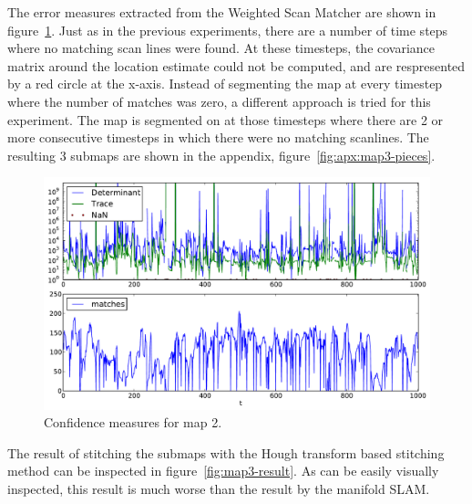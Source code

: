 The error measures extracted from the Weighted Scan Matcher are shown in figure~\ref{fig:map3-confidence}. Just as in the previous experiments, there are a number of time steps where no matching scan lines were found. At these timesteps, the covariance matrix around the location estimate could not be computed, and are respresented by a red circle at the x-axis. Instead of segmenting the map at every timestep where the number of matches was zero, a different approach is tried for this experiment. The map is segmented on at those timesteps where there are 2 or more consecutive timesteps in which there were no matching scanlines. The resulting 3 submaps are shown in the appendix, figure~\ref{fig:apx:map3-pieces}.

\begin{figure}[ht]
\centering
  \includegraphics[width=\textwidth]{images/experiment/map3/error-measures.pdf}
  \caption{Confidence measures for map 2.}
  \label{fig:map3-confidence}
\end{figure}

The result of stitching the submaps with the Hough transform based stitching method can be inspected in figure~\ref{fig:map3-result}. As can be easily visually inspected, this result is much worse than the result by the manifold SLAM.

